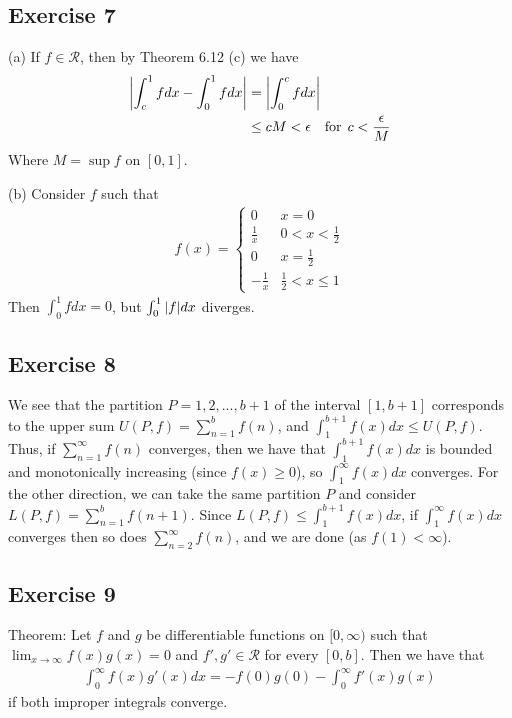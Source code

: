 \subsection{Exercise 7}
(a) If $f \in \mathscr{R}$, then by Theorem 6.12 (c) we have
\begin{align*}
        \abs{\int_{c}^{1} f dx - \int_{0}^{1} f dx} &= \abs{\int_{0}^{c} f dx} \\
                                                    &\leq cM < \epsilon \quad \text{for} \:\:  c < \frac{\epsilon}{M}
\end{align*}
Where $M = \sup{f}$ on $[0, 1]$.

(b) Consider $f$ such that
\begin{align*}
        f(x) =
        \begin{cases}
                0 & x = 0 \\
                \frac{1}{x} & 0 < x < \frac{1}{2} \\
                0 & x = \frac{1}{2} \\
                -\frac{1}{x} & \frac{1}{2} < x \leq 1
        \end{cases}
\end{align*}
Then $\int_{0}^{1} f dx = 0$, but $\int_{0}^{1} \abs{f} dx$ diverges.

\subsection{Exercise 8}
We see that the partition $P = {1, 2, ..., b + 1}$ of the interval $[1, b + 1]$ corresponds to the upper sum
$U(P, f) = \sum_{n = 1}^b f(n)$, and $\int_{1}^{b + 1} f(x) dx \leq U(P, f)$. 
Thus, if $\sum_{n = 1}^\infty f(n)$ converges, then we have that 
$\int_{1}^{b + 1} f(x) dx$ is bounded and monotonically increasing (since $f(x) \geq 0$),
so $\int_{1}^{\infty} f(x) dx $ converges. For the other direction, we can take the same partition $P$ 
and consider $L(P, f) = \sum_{n = 1}^b f(n + 1)$. Since $L(P, f) \leq \int_{1}^{b + 1} f(x) dx$, if 
$\int_{1}^{\infty} f(x) dx$ converges then so does $\sum_{n = 2}^\infty f(n)$, and we are done (as
$f(1) < \infty$).

\subsection{Exercise 9}
Theorem: Let $f$ and $g$ be differentiable functions on $[0, \infty)$ such that 
$\lim_{x \to \infty} f(x)g(x) = 0$ and $f', g' \in \mathscr{R}$ for every $[0, b]$. Then we have that
\begin{align*}
        \int_{0}^{\infty} f(x) g'(x) dx = -f(0)g(0) - \int_{0}^{\infty} f'(x) g(x) 
\end{align*}
if both improper integrals converge.

